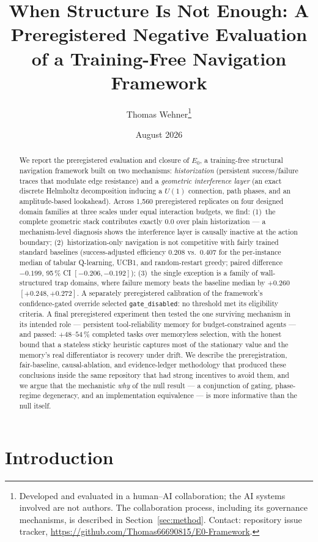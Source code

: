 \documentclass[11pt]{article}
\title{When Structure Is Not Enough: A Preregistered Negative Evaluation\\
of a Training-Free Navigation Framework}
\author{Thomas Wehner\thanks{Developed and evaluated in a human--AI
collaboration; the AI systems involved are not authors. The collaboration
process, including its governance mechanisms, is described in
Section~\ref{sec:method}. Contact: repository issue tracker,
\url{https://github.com/Thomas66690815/E0-Framework}.}}
\date{August 2026}
\newcommand{\Ez}{$E_0$}
\begin{document}
\maketitle

\begin{abstract}
We report the preregistered evaluation and closure of \Ez{}, a training-free
structural navigation framework built on two mechanisms: \emph{historization}
(persistent success/failure traces that modulate edge resistance) and a
\emph{geometric interference layer} (an exact discrete Helmholtz
decomposition inducing a $U(1)$ connection, path phases, and an
amplitude-based lookahead). Across 1{,}560 preregistered replicates on four
designed domain families at three scales under equal interaction budgets, we
find: (1)~the complete geometric stack contributes exactly $0.0$ over plain
historization --- a mechanism-level diagnosis shows the interference layer is
causally inactive at the action boundary; (2)~historization-only navigation
is not competitive with fairly trained standard baselines (success-adjusted
efficiency $0.208$ vs.\ $0.407$ for the per-instance median of tabular
Q-learning, UCB1, and random-restart greedy; paired difference $-0.199$,
95\,\% CI $[-0.206, -0.192]$); (3)~the single exception is a family of
wall-structured trap domains, where failure memory beats the baseline median
by $+0.260$ $[+0.248, +0.272]$. A separately preregistered calibration of
the framework's confidence-gated override selected \texttt{gate\_disabled}:
no threshold met its eligibility criteria. A final preregistered experiment
then tested the one surviving mechanism in its intended role --- persistent
tool-reliability memory for budget-constrained agents --- and passed:
$+48$--$54\,\%$ completed tasks over memoryless selection, with the honest
bound that a stateless sticky heuristic captures most of the stationary
value and the memory's real differentiator is recovery under drift. We
describe the preregistration, fair-baseline, causal-ablation, and
evidence-ledger methodology that produced these conclusions inside the same
repository that had strong incentives to avoid them, and we argue that the
mechanistic \emph{why} of the null result --- a conjunction of gating,
phase-regime degeneracy, and an implementation equivalence --- is more
informative than the null itself.
\end{abstract}

\section{Introduction}
\end{document}
